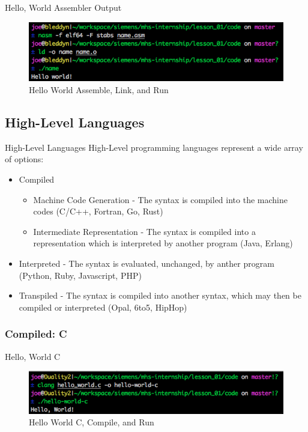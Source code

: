 \documentclass[serif,mathserif,compress]{beamer}
\begin{document}
\begin{frame}[fragile]{Hello, World Assembler Output}
  \begin{figure}
  \centering
  \includegraphics[width=\textwidth]{images/hello-world-asm.png}
  \caption{Hello World Assemble, Link, and Run}
  \label{fig:hello-world-asm-output}
  \end{figure}
\end{frame}

\subsection{High-Level Languages}

\begin{frame}{High-Level Languages}
  High-Level programming languages represent a wide array of options:
  \begin{itemize}[<+->]
    \item Compiled
    \begin{itemize}[<+->]
      \item Machine Code Generation - The syntax is compiled into the machine codes (C/C++, Fortran, Go, Rust)
      \item Intermediate Representation - The syntax is compiled into a representation which is interpreted by another program (Java, Erlang)
    \end{itemize}
    \item Interpreted - The syntax is evaluated, unchanged, by anther program (Python, Ruby, Javascript, PHP)
    \item Transpiled - The syntax is compiled into another syntax, which may then be compiled or interpreted (Opal, 6to5, HipHop)
  \end{itemize}
\end{frame}

\subsubsection{Compiled: C}
\begin{frame}[fragile]{Hello, World C}
  
  \pause

  \begin{figure}
  \centering
  \includegraphics[width=\textwidth]{images/hello-world-c.png}
  \caption{Hello World C, Compile, and Run}
  \label{fig:hello-world-c-output}
  \end{figure}
\end{frame}
\end{document}

